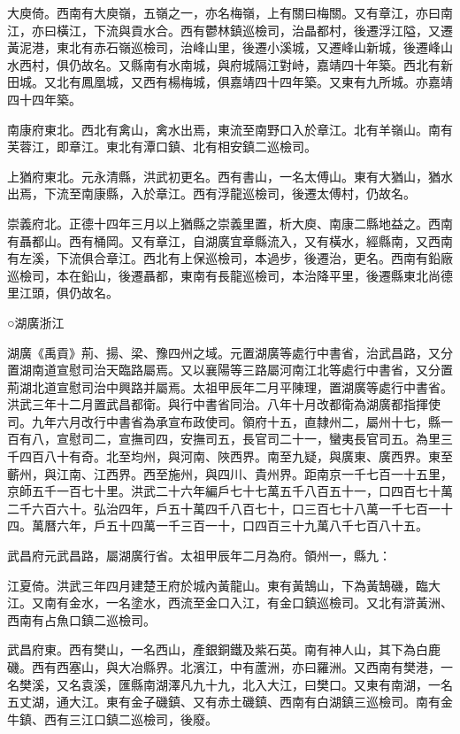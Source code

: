 大庾倚。西南有大庾嶺，五嶺之一，亦名梅嶺，上有關曰梅關。又有章江，亦曰南江，亦曰橫江，下流與貢水合。西有鬱林鎮巡檢司，治晶都村，後遷浮江隘，又遷黃泥港，東北有赤石嶺巡檢司，治峰山里，後遷小溪城，又遷峰山新城，後遷峰山水西村，俱仍故名。又縣南有水南城，與府城隔江對峙，嘉靖四十年築。西北有新田城。又北有鳳凰城，又西有楊梅城，俱嘉靖四十四年築。又東有九所城。亦嘉靖四十四年築。

南康府東北。西北有禽山，禽水出焉，東流至南野口入於章江。北有羊嶺山。南有芙蓉江，即章江。東北有潭口鎮、北有相安鎮二巡檢司。

上猶府東北。元永清縣，洪武初更名。西有書山，一名太傅山。東有大猶山，猶水出焉，下流至南康縣，入於章江。西有浮龍巡檢司，後遷太傅村，仍故名。

崇義府北。正德十四年三月以上猶縣之崇義里置，析大庾、南康二縣地益之。西南有聶都山。西有桶岡。又有章江，自湖廣宜章縣流入，又有橫水，經縣南，又西南有左溪，下流俱合章江。西北有上保巡檢司，本過步，後遷治，更名。西南有鉛廠巡檢司，本在鉛山，後遷聶都，東南有長龍巡檢司，本治降平里，後遷縣東北尚德里江頭，俱仍故名。

○湖廣浙江

湖廣《禹貢》荊、揚、梁、豫四州之域。元置湖廣等處行中書省，治武昌路，又分置湖南道宣慰司治天臨路屬焉。又以襄陽等三路屬河南江北等處行中書省，又分置荊湖北道宣慰司治中興路并屬焉。太祖甲辰年二月平陳理，置湖廣等處行中書省。洪武三年十二月置武昌都衛。與行中書省同治。八年十月改都衛為湖廣都指揮使司。九年六月改行中書省為承宣布政使司。領府十五，直隸州二，屬州十七，縣一百有八，宣慰司二，宣撫司四，安撫司五，長官司二十一，蠻夷長官司五。為里三千四百八十有奇。北至均州，與河南、陜西界。南至九疑，與廣東、廣西界。東至蘄州，與江南、江西界。西至施州，與四川、貴州界。距南京一千七百一十五里，京師五千一百七十里。洪武二十六年編戶七十七萬五千八百五十一，口四百七十萬二千六百六十。弘治四年，戶五十萬四千八百七十，口三百七十八萬一千七百一十四。萬曆六年，戶五十四萬一千三百一十，口四百三十九萬八千七百八十五。

武昌府元武昌路，屬湖廣行省。太祖甲辰年二月為府。領州一，縣九：

江夏倚。洪武三年四月建楚王府於城內黃龍山。東有黃鵠山，下為黃鵠磯，臨大江。又南有金水，一名塗水，西流至金口入江，有金口鎮巡檢司。又北有滸黃洲、西南有占魚口鎮二巡檢司。

武昌府東。西有樊山，一名西山，產銀銅鐵及紫石英。南有神人山，其下為白鹿磯。西有西塞山，與大冶縣界。北濱江，中有蘆洲，亦曰羅洲。又西南有樊港，一名樊溪，又名袁溪，匯縣南湖澤凡九十九，北入大江，曰樊口。又東有南湖，一名五丈湖，通大江。東有金子磯鎮、又有赤土磯鎮、西南有白湖鎮三巡檢司。南有金牛鎮、西有三江口鎮二巡檢司，後廢。

